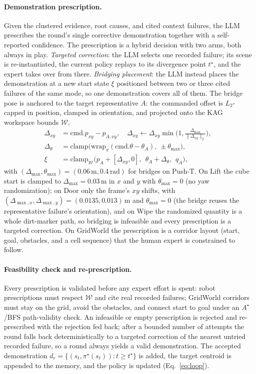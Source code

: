 \documentclass[letterpaper]{article} %
\begin{document}
\paragraph{Demonstration prescription.}
Given the clustered evidence, root causes, and cited context failures, the
LLM prescribes the round's single corrective demonstration together with a
self-reported confidence. The prescription is a hybrid decision with two
arms, both always in play. \emph{Targeted correction}: the LLM selects one
recorded failure; its scene is re-instantiated, the current policy replays to
its divergence point $t^\star$, and the expert takes over from there.
\emph{Bridging placement}: the LLM instead places the demonstration at
a new start state $\xi$ positioned between two or three cited failures of the
same mode, so one demonstration covers all of them. The bridge pose is
anchored to the target representative $A$: the commanded offset is
$L_2$-capped in position, clamped in orientation, and projected onto the KAG
workspace bounds $\mathcal{W}$,
\begin{align}
\Delta_{xy}&=\mathrm{cmd}.p_{xy}-p_{A,xy},
\quad
\Delta_{xy}\leftarrow
\Delta_{xy}\min\!\Big(1,\tfrac{\Delta_{\max}}{\|\Delta_{xy}\|_2}\Big),
\nonumber\\
\Delta_{\theta}&=\mathrm{clamp}\big(
\mathrm{wrap}_{\pi}(\mathrm{cmd}.\theta-\theta_A),\ \pm\theta_{\max}\big),
\nonumber\\
\xi&=\mathrm{clamp}_{\mathcal{W}}\big(
p_A+[\Delta_{xy},0],\ \ \theta_A+\Delta_{\theta},\ \ q_A\big),
\label{eq:prescribe}
\end{align}
with $(\Delta_{\max},\theta_{\max})=(0.06\,\mathrm{m},0.4\,\mathrm{rad})$ for
bridges on Push-T. On Lift the cube start is clamped to
$\Delta_{\max}=0.03$\,m in $x$ and $y$ with $\theta_{\max}=0$ (no yaw
randomization); on Door only the frame's $xy$ shifts, with
$(\Delta_{\max,x},\Delta_{\max,y})=(0.0135,0.013)$\,m and $\theta_{\max}=0$
(the bridge reuses the representative failure's orientation), and on Wipe
the randomized quantity is a whole dirt-marker path, so bridging is
infeasible and every prescription is a targeted correction. On GridWorld the
prescription is a corridor layout (start, goal, obstacles, and a cell
sequence) that the human expert is constrained to follow.

\paragraph{Feasibility check and re-prescription.}
Every prescription is validated before any expert effort is spent: robot
prescriptions must respect $\mathcal{W}$ and cite real recorded failures;
GridWorld corridors must stay on the grid, avoid the obstacles, and connect
start to goal under an $A^{\!\star}$/BFS path-validity check. An infeasible or empty prescription
is rejected and re-prescribed with the rejection fed back; after a bounded
number of attempts the round falls back deterministically to a targeted
correction of the nearest untried recorded failure, so a round always yields
a valid demonstration. The accepted demonstration
$d_r=\{(s_t,\pi^\star(s_t)):t\ge t^\star\}$ is added, the target centroid is
appended to the memory, and the policy is updated (Eq.~\ref{eq:loop}).
\end{document}
